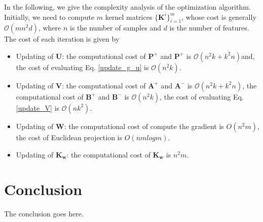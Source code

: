 \documentclass[10pt,journal,compsoc]{IEEEtran}
\begin{document}
In the following, we give the complexity analysis of the optimization algorithm. Initially, we need to compute $m$ kernel matrices $\{ \mathbf{K}^{i}\}_{i=1}^{m}$, whose cost is generally $\mathcal{O}(m n^2 d)$, where $n$ is the number of samples and $d$ is the number of features. The cost of each iteration is given by
\begin{itemize}
\item Updating of $\mathbf{U}$: the computational cost of $\mathbf{P}^{+}$ and $\mathbf{P}^{+}$ is $\mathcal{O}(n^2 k + k^2 n)$and, the cost of evaluating Eq. \eqref{update_g_u} is $\mathcal{O}(n^2 k)$.
\item Updating of $\mathbf{V}$: the computational cost of $\mathbf{A}^{+}$ and $\mathbf{A}^{-}$ is $\mathcal{O}(n^2 k + k^2 n)$, the computational cost of $\mathbf{B}^{+}$ and $\mathbf{B}^{-}$ is $\mathcal{O}(n^2 k)$, the cost of evaluating Eq. \eqref{update_V} is $\mathcal{O}(n k^2)$.
\item Updating of $\mathbf{W}$: the computational cost of compute the gradient is $O(n^2m)$, the cost of Euclidean projection is $O(nmlogm)$.
\item Updating of $\mathbf{K}_{\mathbf{w}}$: the computational cost of $\mathbf{K}_{\mathbf{w}}$ is $n^2 m $.
\end{itemize}




\section{Conclusion}
The conclusion goes here.






%
\end{document}
